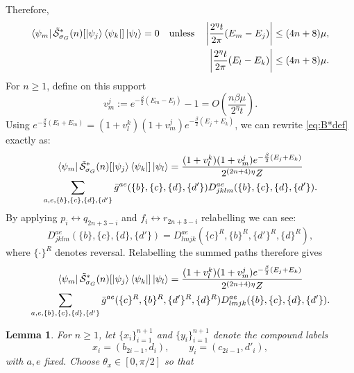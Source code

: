 \documentclass[aps,floatfix,10pt,amssymb,amsfont,amsmath,superscriptaddress,float,nofootinbib,longbibliography,nobalancelastpage,twocolumn]{revtex4-2}
\newtheorem{lemma}{Lemma}
\begin{document}
\begin{widetext}
\begin{equation}
\end{equation}
Therefore,
\begin{equation}
\begin{aligned}
    \bra{\psi_m}\tilde{\mathcal{S}}^*_{\sigma_G}(n)[\ket{\psi_j}\bra{\psi_k}]\ket{\psi_l}=0\quad\text{unless}\quad
    \left|\frac{2^{\eta}t}{2\pi}(E_m-E_j)\right|&\leq(4n+8)\mu,\\
    \left|\frac{2^{\eta}t}{2\pi}(E_l-E_k)\right|&\leq(4n+8)\mu.
\end{aligned}
\end{equation}
For $n\geq1$, define on this support
\begin{equation*}
    v_m^j:=e^{-\frac{\beta}{2}(E_m-E_j)}-1=O(\frac{n\beta \mu}{2^{\eta}t}).
\end{equation*}
Using $e^{-\frac{\beta}{2}(E_l+E_m)}=(1+v_l^k)(1+v_m^j)e^{-\frac{\beta}{2}(E_j+E_k)}$, we can rewrite \eqref{eq:B*def} exactly as:
\begin{multline}
     \bra{\psi_m}\tilde{\mathcal{S}}^*_{\sigma_G}(n)[\ket{\psi_j}\bra{\psi_k}]\ket{\psi_l} = \frac{(1+v_l^k)(1+v_m^j)e^{-\frac{\beta}{2}(E_j+E_k)}}{2^{(2n+4)\eta}Z}\\\sum_{a,e,\{b\},\{c\},\{d\},\{d'\}} \bar g^{ae}(\{b\},\{c\},\{d\},\{d'\}) D^{ae}_{jklm}(\{b\},\{c\},\{d\},\{d'\}).
\end{multline}
By applying $p_i \leftrightarrow q_{2n+3-i}$ and $f_i \leftrightarrow r_{2n+3-i}$ relabelling we can see:
\begin{equation*}
    D^{ae}_{jklm}(\{b\},\{c\},\{d\},\{d'\})
    =D^{ae}_{lmjk}(\{c\}^R,\{b\}^R,\{d'\}^R,\{d\}^R),
\end{equation*}
where $\{\cdot\}^R$ denotes reversal.
Relabelling the summed paths therefore gives
\begin{multline}
     \bra{\psi_m}\tilde{\mathcal{S}}^*_{\sigma_G}(n)[\ket{\psi_j}\bra{\psi_k}]\ket{\psi_l} = \frac{(1+v_l^k)(1+v_m^j)e^{-\frac{\beta}{2}(E_j+E_k)}}{2^{(2n+4)\eta}Z}\\\sum_{a,e,\{b\},\{c\},\{d\},\{d'\}} \bar g^{ae}(\{c\}^R,\{b\}^R,\{d'\}^R,\{d\}^R) D^{ae}_{lmjk}(\{b\},\{c\},\{d\},\{d'\}).
     \label{eq:relabelline}
\end{multline}
\begin{lemma}
\label{lemma:summed-history-reversal}
For $n\geq1$, let $\{x_i\}_{i=1}^{n+1}$ and $\{y_i\}_{i=1}^{n+1}$ denote
the compound labels
\begin{equation*}
    x_i=(b_{2i-1},d_i),\qquad y_i=(c_{2i-1},d'_i),
\end{equation*}
with $a,e$ fixed.  Choose $\theta_x\in[0,\pi/2]$ so that

\end{lemma}
\end{widetext}
\end{document}
